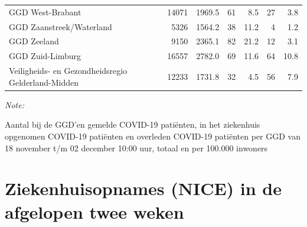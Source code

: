 \documentclass[
  english,
  man,floatsintext]{apa6}
\begin{document}
\begin{table}
\begin{threeparttable}
\begin{tabular}{lrrrrrr}
GGD West-Brabant & 14071 & 1969.5 & 61 & 8.5 & 27 & 3.8\\
GGD Zaanstreek/Waterland & 5326 & 1564.2 & 38 & 11.2 & 4 & 1.2\\
GGD Zeeland & 9150 & 2365.1 & 82 & 21.2 & 12 & 3.1\\
GGD Zuid-Limburg & 16557 & 2782.0 & 69 & 11.6 & 64 & 10.8\\
Veiligheids- en Gezondheidsregio Gelderland-Midden & 12233 & 1731.8 & 32 & 4.5 & 56 & 7.9\\
\bottomrule
\end{tabular}
\begin{tablenotes}
\item \textit{Note: } 
\item Aantal bij de GGD’en gemelde COVID-19 patiënten, in het ziekenhuis opgenomen COVID-19 patiënten en overleden COVID-19 patiënten per GGD van 18 november t/m 02 december 10:00 uur, totaal en per 100.000 inwoners
\end{tablenotes}
\end{threeparttable}
\endgroup{}
\end{table}

\newpage

\hypertarget{ziekenhuisopnames-nice-in-de-afgelopen-twee-weken}{%
\section{Ziekenhuisopnames (NICE) in de afgelopen twee weken}\label{ziekenhuisopnames-nice-in-de-afgelopen-twee-weken}}
\end{document}
